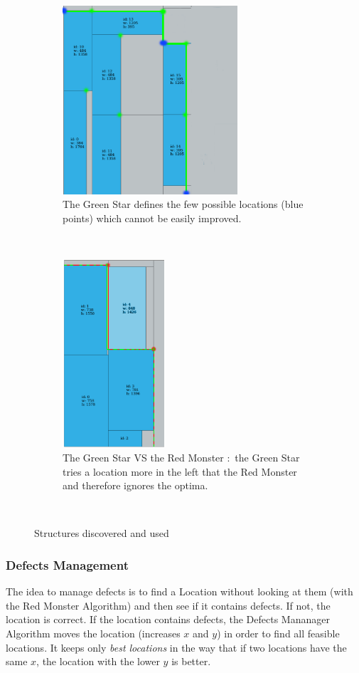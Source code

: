 \documentclass{article}
\begin{document}
\begin{figure}
    \centering
    \begin{subfigure}[b]{0.48\textwidth}
        \includegraphics[height=7cm]{greenStart.png}
        \caption{The Green Star defines the few possible locations (blue points) which cannot be easily improved.}
        \label{fig:gull}
    \end{subfigure}
    ~ %
    \begin{subfigure}[b]{0.48\textwidth}
        \centering
        \includegraphics[height=7cm]{greenvsred.png}
        \caption{The Green Star VS the Red Monster : the Green Star tries a location more in the left that the Red Monster and therefore ignores the optima.}
        \label{fig:tiger}
    \end{subfigure}
    ~ %
    \caption{Structures discovered and used}\label{fig:animals}
\end{figure}

        \subsubsection{Defects Management}
The idea to manage defects is to find a Location without looking at them (with the Red Monster Algorithm) and then see if it contains defects. If not, the location is correct. If the location contains defects, the Defects Mananager Algorithm moves the location (increases $x$ and $y$) in order to find all feasible locations. It keeps only \textit{best locations} in the way that if two locations have the same $x$, the location with the lower $y$ is better.
\end{document}

